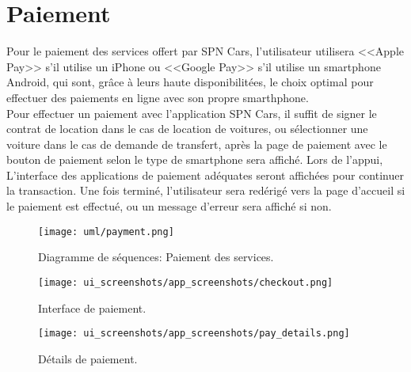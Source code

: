 \section{Paiement}
Pour le paiement des services offert par SPN Cars, l'utilisateur utilisera <<Apple Pay>> s'il utilise un iPhone ou <<Google Pay>> s'il utilise un smartphone Android, qui sont, grâce à leurs haute disponibilitées, le choix optimal pour effectuer des paiements en ligne avec son propre smarthphone.\\
Pour effectuer un paiement avec l'application SPN Cars, il suffit de signer le contrat de location dans le cas de location de voitures, ou sélectionner une voiture dans le cas de demande de transfert, après la page de paiement avec le bouton de paiement selon le type de smartphone sera affiché. Lors de l'appui, L'interface des applications de paiement adéquates seront affichées pour continuer la transaction. Une fois terminé, l'utilisateur sera redérigé vers la page d'accueil si le paiement est effectué, ou un message d'erreur sera affiché si non.
\vspace{.5cm}
\begin{figure}[H]
    \centering
    \texttt{[image: uml/payment.png]}
    \captionsetup{justification=centering}
    \caption{Diagramme de séquences: Paiement des services.}
    \label{fig:seq_payment}
\end{figure}
\clearpage
\begin{multicols}{2}
    \begin{figure}[H]
        \centering
        \texttt{[image: ui\_screenshots/app\_screenshots/checkout.png]}
        \captionsetup{justification=centering}
        \caption{Interface de paiement.}
        \label{fig:checkout}
    \end{figure}
    \begin{figure}[H]
        \centering
        \texttt{[image: ui\_screenshots/app\_screenshots/pay\_details.png]}
        \captionsetup{justification=centering}
        \caption{Détails de paiement.}
        \label{fig:pay_details}
    \end{figure}
\end{multicols}
